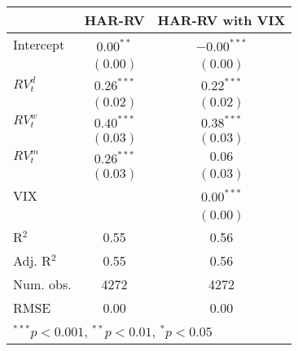 
\begin{tabular}{l c c }
\hline
 & HAR-RV & HAR-RV with VIX \\
\hline
Intercept    & $0.00^{**}$  & $-0.00^{***}$ \\
             & $(0.00)$     & $(0.00)$      \\
$RV_{t}^{d}$ & $0.26^{***}$ & $0.22^{***}$  \\
             & $(0.02)$     & $(0.02)$      \\
$RV_{t}^{w}$ & $0.40^{***}$ & $0.38^{***}$  \\
             & $(0.03)$     & $(0.03)$      \\
$RV_{t}^{m}$ & $0.26^{***}$ & $0.06$        \\
             & $(0.03)$     & $(0.03)$      \\
VIX          &              & $0.00^{***}$  \\
             &              & $(0.00)$      \\
\hline
R$^2$        & 0.55         & 0.56          \\
Adj. R$^2$   & 0.55         & 0.56          \\
Num. obs.    & 4272         & 4272          \\
RMSE         & 0.00         & 0.00          \\
\hline
\multicolumn{3}{l}{\scriptsize{$^{***}p<0.001$, $^{**}p<0.01$, $^*p<0.05$}}
\end{tabular}

